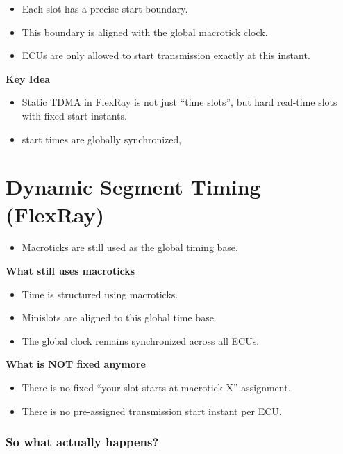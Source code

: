 \begin{itemize}
    \item Each slot has a precise start boundary.
    \item This boundary is aligned with the global macrotick clock.
    \item ECUs are only allowed to start transmission exactly at this instant.
\end{itemize}
\begin{mdframed}[backgroundcolor=lightgray, linewidth=0pt, innertopmargin=8pt,
innerbottommargin=8pt]
\textbf{Key Idea}
\begin{itemize}
    \item Static TDMA in FlexRay is not just “time slots”, but hard real-time slots with fixed start instants.
    \item start times are globally synchronized,
\end{itemize}
\end{mdframed}


\section{Dynamic Segment Timing (FlexRay)}
\begin{itemize}
    \item Macroticks are still used as the global timing base.
\end{itemize}

\textbf{What still uses macroticks}
\begin{itemize}
    \item Time is structured using macroticks.
    \item Minislots are aligned to this global time base.
    \item The global clock remains synchronized across all ECUs.
\end{itemize}

\textbf{ What is NOT fixed anymore}
\begin{itemize}
    \item There is no fixed ``your slot starts at macrotick X'' assignment.
    \item There is no pre-assigned transmission start instant per ECU.
\end{itemize}

\subsubsection*{So what actually happens?}

